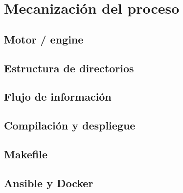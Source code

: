 \section{Mecanización del proceso}
\subsection{Motor / engine}
\subsection{Estructura de directorios}
\subsection{Flujo de información}

\subsection{Compilación y despliegue}
\subsection{Makefile}
\subsection{Ansible y Docker}

